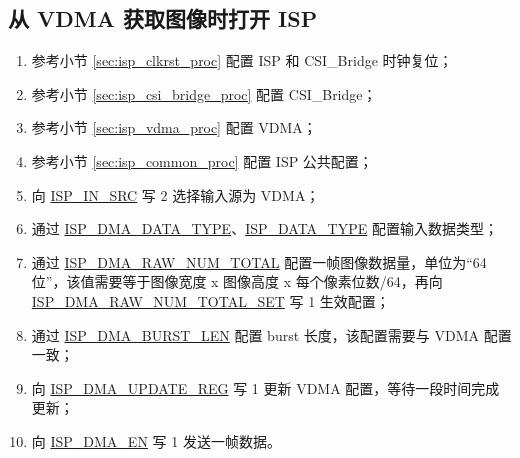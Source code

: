 \documentclass[main\_\_CN.tex]{subfiles}
\begin{document}
\subsection{从 VDMA 获取图像时打开 ISP}
\begin{enumerate}
    \item 参考小节 \ref{sec:isp_clkrst_proc} 配置 ISP 和 CSI\_Bridge 时钟复位；

    \item 参考小节 \ref{sec:isp_csi_bridge_proc} 配置 CSI\_Bridge；

    \item 参考小节 \ref{sec:isp_vdma_proc} 配置 VDMA；

    \item 参考小节 \ref{sec:isp_common_proc} 配置 ISP 公共配置；

    \item 向 \hyperref[fielddesc:ISPINSRC]{ISP\_IN\_SRC} 写 2 选择输入源为 VDMA；


    \item 通过 \hyperref[fielddesc:ISPDMADATATYPE]{ISP\_DMA\_DATA\_TYPE}、\hyperref[fielddesc:ISPDATATYPE]{ISP\_DATA\_TYPE} 配置输入数据类型；

    \item 通过 \hyperref[fielddesc:ISPDMARAWNUMTOTAL]{ISP\_DMA\_RAW\_NUM\_TOTAL} 配置一帧图像数据量，单位为“64 位”，该值需要等于图像宽度 x 图像高度 x 每个像素位数/64，再向 \hyperref[fielddesc:ISPDMARAWNUMTOTALSET]{ISP\_DMA\_RAW\_NUM\_TOTAL\_SET} 写 1 生效配置；

    \item 通过 \hyperref[fielddesc:ISPDMABURSTLEN]{ISP\_DMA\_BURST\_LEN} 配置 burst 长度，该配置需要与 VDMA 配置一致；

    \item 向 \hyperref[fielddesc:ISPDMAUPDATEREG]{ISP\_DMA\_UPDATE\_REG} 写 1 更新 VDMA 配置，等待一段时间完成更新；

    \item 向 \hyperref[fielddesc:ISPDMAEN]{ISP\_DMA\_EN} 写 1 发送一帧数据。
\end{enumerate}
\end{document}
